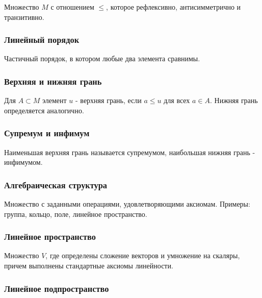 \documentclass[
  11pt,
  a4paper,
]{article}
\begin{document}
Множество \(M\) с отношением \(\le\), которое рефлексивно,
антисимметрично и транзитивно.

\subsubsection{Линейный
порядок}\label{ux43bux438ux43dux435ux439ux43dux44bux439-ux43fux43eux440ux44fux434ux43eux43a}

Частичный порядок, в котором любые два элемента сравнимы.

\subsubsection{Верхняя и нижняя
грань}\label{ux432ux435ux440ux445ux43dux44fux44f-ux438-ux43dux438ux436ux43dux44fux44f-ux433ux440ux430ux43dux44c}

Для \(A\subset M\) элемент \(u\) - верхняя грань, если \(a\le u\) для
всех \(a\in A\). Нижняя грань определяется аналогично.

\subsubsection{Супремум и
инфимум}\label{ux441ux443ux43fux440ux435ux43cux443ux43c-ux438-ux438ux43dux444ux438ux43cux443ux43c}

Наименьшая верхняя грань называется супремумом, наибольшая нижняя грань
- инфимумом.

\subsubsection{Алгебраическая
структура}\label{ux430ux43bux433ux435ux431ux440ux430ux438ux447ux435ux441ux43aux430ux44f-ux441ux442ux440ux443ux43aux442ux443ux440ux430}

Множество с заданными операциями, удовлетворяющими аксиомам. Примеры:
группа, кольцо, поле, линейное пространство.

\subsubsection{Линейное
пространство}\label{ux43bux438ux43dux435ux439ux43dux43eux435-ux43fux440ux43eux441ux442ux440ux430ux43dux441ux442ux432ux43e}

Множество \(V\), где определены сложение векторов и умножение на
скаляры, причем выполнены стандартные аксиомы линейности.

\subsubsection{Линейное
подпространство}\label{ux43bux438ux43dux435ux439ux43dux43eux435-ux43fux43eux434ux43fux440ux43eux441ux442ux440ux430ux43dux441ux442ux432ux43e}
\end{document}
